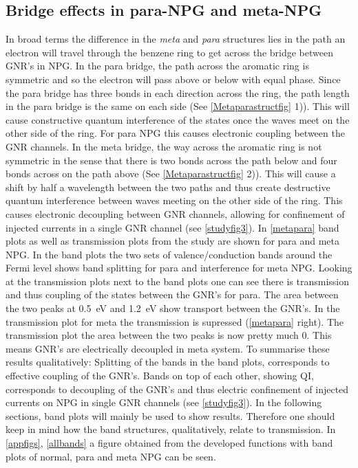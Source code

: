 \subsection{Bridge effects in para-NPG and meta-NPG}\label{metaparasection}
In broad terms the difference in the \textit{meta} and \textit{para} structures lies in the path an electron will travel through the benzene ring to get across the bridge between GNR's in NPG. In the para bridge, the path across the aromatic ring is symmetric and so the electron will pass above or below with equal phase. Since the para bridge has three bonds in each direction across the ring, the path length in the para bridge is the same on each side (See \cref{Metaparastructfig} 1)). This will cause constructive quantum interference of the states once the waves meet on the other side of the ring. For para NPG this causes electronic coupling between the GNR channels. In the meta bridge, the way across the aromatic ring is not symmetric in the sense that there is two bonds across the path below and four bonds across on the path above (See \cref{Metaparastructfig} 2)). This will cause a shift by half a wavelength between the two paths and thus create destructive quantum interference between waves meeting on the other side of the ring. This causes electronic decoupling between GNR channels, allowing for confinement of injected currents in a single GNR channel\cite{unpub} (see \cref{studyfig3}). In \cref{metapara} band plots as well as transmission plots from the study\cite{unpub} are shown for para and meta NPG. In the band plots the two sets of valence/conduction bands around the Fermi level shows band splitting for para and interference for meta NPG. Looking at the transmission plots next to the band plots one can see there is transmission and thus coupling of the states between the GNR's for para. The area between the two peaks at \SI{0.5}{\electronvolt} and  \SI{1.2}{\electronvolt} show transport between the GNR's. In the transmission plot for meta the transmission is supressed (\cref{metapara} right). The transmission plot the area between the two peaks is now pretty much 0. This means GNR's are electrically decoupled in meta system. To summarise these results qualitatively: Splitting of the bands in the band plots, corresponds to effective coupling of the GNR's. Bands on top of each other, showing QI, corresponds to decoupling of the GNR's and thus electric confinement of injected currents on NPG in single GNR channels (see \cref{studyfig3}). In the following sections, band plots will mainly be used to show results. Therefore one should keep in mind how the band structures, qualitatively, relate to transmission. In \cref{appfigs}, \cref{allbands} a figure obtained from the developed functions with band plots of normal, para and meta NPG can be seen.
